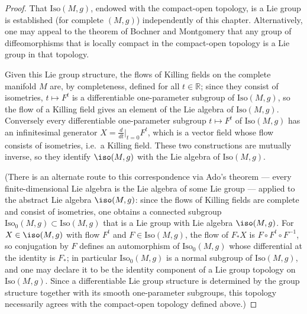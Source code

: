 \begin{proof}
  That $\mathrm{Iso}(M,g)$, endowed with the compact-open topology, is a Lie
  group is established (for complete $(M,g)$) independently of this chapter.
  Alternatively, one may appeal to the theorem of Bochner and Montgomery that
  any group of diffeomorphisms that is locally compact in the compact-open
  topology is a Lie group in that topology.

  Given this Lie group structure, the flows of Killing fields on the complete
  manifold $M$ are, by completeness, defined for all $t\in\mathbb{R}$; since they
  consist of isometries, $t\mapsto F^t$ is a differentiable one-parameter
  subgroup of $\mathrm{Iso}(M,g)$, so the flow of a Killing field gives an
  element of the Lie algebra of $\mathrm{Iso}(M,g)$. Conversely every
  differentiable one-parameter subgroup $t\mapsto F^t$ of $\mathrm{Iso}(M,g)$
  has an infinitesimal generator $X=\frac{d}{dt}\big|_{t=0}F^t$, which is a
  vector field whose flow consists of isometries, i.e.\ a Killing field. These
  two constructions are mutually inverse, so they identify $\iso(M,g)$ with the
  Lie algebra of $\mathrm{Iso}(M,g)$.

  (There is an alternate route to this correspondence via Ado's theorem — every
  finite-dimensional Lie algebra is the Lie algebra of some Lie group — applied
  to the abstract Lie algebra $\iso(M,g)$: since the flows of Killing fields are
  complete and consist of isometries, one obtains a connected subgroup
  $\mathrm{Iso}_0(M,g)\subset\mathrm{Iso}(M,g)$ that is a Lie group with Lie
  algebra $\iso(M,g)$. For $X\in\iso(M,g)$ with flow $F^t$ and
  $F\in\mathrm{Iso}(M,g)$, the flow of $F_*X$ is $F\circ F^t\circ F^{-1}$, so
  conjugation by $F$ defines an automorphism of $\mathrm{Iso}_0(M,g)$ whose
  differential at the identity is $F_*$; in particular $\mathrm{Iso}_0(M,g)$ is
  a normal subgroup of $\mathrm{Iso}(M,g)$, and one may declare it to be the
  identity component of a Lie group topology on $\mathrm{Iso}(M,g)$. Since a
  differentiable Lie group structure is determined by the group structure
  together with its smooth one-parameter subgroups, this topology necessarily
  agrees with the compact-open topology defined above.)
\end{proof}

